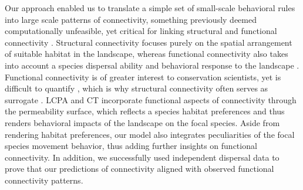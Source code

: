 \documentclass[../FinalThesis.tex]{subfiles}
\begin{document}

Our approach enabled us to translate a simple set of small-scale behavioral
rules into large scale patterns of connectivity, something previously deemed
computationally unfeasible, yet critical for linking structural and functional
connectivity \citep{Doerr.2011}. Structural connectivity focuses purely on the
spatial arrangement of suitable habitat in the landscape, whereas functional
connectivity also takes into account a species dispersal ability and behavioral
response to the landscape \citep{Tischendorf.2000}. Functional connectivity is
of greater interest to conservation scientists, yet is difficult to quantify
\citep{Baguette.2013}, which is why structural connectivity often serves as
surrogate \citep{Doerr.2011, Fattebert.2015}. LCPA and CT incorporate functional
aspects of connectivity through the permeability surface, which reflects a
species habitat preferences and thus renders behavioral impacts of the landscape
on the focal species. Aside from rendering habitat preferences, our model also
integrates peculiarities of the focal species movement behavior, thus adding
further insights on functional connectivity. In addition, we successfully used
independent dispersal data to prove that our predictions of connectivity aligned
with observed functional connectivity patterns.
\end{document}
